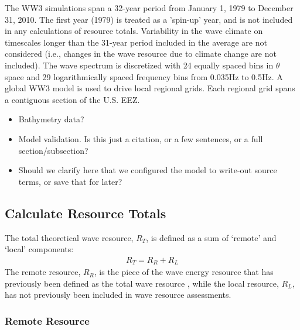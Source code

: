 The WW3 simulations span a 32-year period from January 1, 1979 to December 31, 2010. The first year (1979) is treated as a 'spin-up' year, and is not included in any calculations of resource totals. Variability in the wave climate on timescales longer than the 31-year period included in the average are not considered (i.e., changes in the wave resource due to climate change are not included).
The wave spectrum is discretized with 24 equally spaced bins in $\theta$ space and 29 logarithmically spaced frequency bins from 0.035Hz to 0.5Hz. A global WW3 model is used to drive local regional grids. Each regional grid spans a contiguous section of the U.S. EEZ.

\begin{itemize}
\item Bathymetry data?
\item Model validation. Is this just a citation, or a few sentences, or a full section/subsection?
\item Should we clarify here that we configured the model to write-out source terms, or save that for later?
\end{itemize}

\subsection{Calculate Resource Totals} \label{sec:method:calc}

The total theoretical wave resource, $R_T$, is defined as a sum of `remote' and `local' components:
\begin{align}
  R_T = R_R + R_L
\end{align}
The remote resource, $R_R$, is the piece of the wave energy resource that has previously been defined as the total wave resource \citep{gunnQuantifyingGlobalWave2012,EPRIwaveresource2011}, while the local resource, $R_L$, has not previously been included in wave resource assessments.

\subsubsection{Remote Resource} \label{sec:method:calc:remote}

